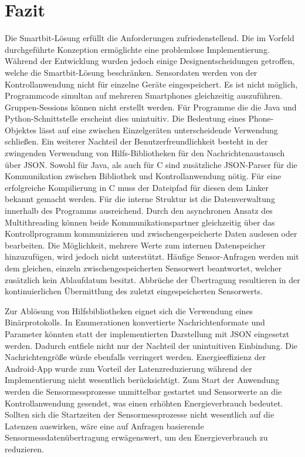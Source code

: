 \documentclass[11pt,a4paper]{report}
\begin{document}
\chapter{Fazit}\label{chap:fazit}
Die Smartbit-Lösung erfüllt die Anforderungen zufriedenstellend.
Die im Vorfeld durchgeführte Konzeption ermöglichte eine problemlose Implementierung.
Während der Entwicklung wurden jedoch einige Designentscheidungen getroffen, welche die Smartbit-Lösung beschränken.
Sensordaten werden von der Kontrollanwendung nicht für einzelne Geräte eingespeichert.
Es ist nicht möglich, Programmcode simultan auf mehreren Smartphones gleichzeitig auszuführen.
Gruppen-Sessions können nicht erstellt werden.
Für Programme die die Java und Python-Schnittstelle erscheint dies unintuitiv.
Die Bedeutung eines Phone-Objektes lässt auf eine zwischen Einzelgeräten unterscheidende Verwendung schließen.
Ein weiterer Nachteil der Benutzerfreundlichkeit besteht in der zwingenden Verwendung von Hilfs-Bibliotheken für den Nachrichtenaustausch über JSON.
Sowohl für Java, als auch für C sind zusätzliche JSON-Parser für die Kommunikation zwischen Bibliothek und Kontrollanwendung nötig.
Für eine erfolgreiche Kompilierung in C muss der Dateipfad für diesen dem Linker bekannt gemacht werden.
Für die interne Struktur ist die Datenverwaltung innerhalb des Programms ausreichend.
Durch den asynchronen Ansatz des Multithreading können beide Kommunikationspartner gleichzeitig über das Kontrollprogramm kommunizieren und zwischengespeicherte Daten auslesen oder bearbeiten.
Die Möglichkeit, mehrere Werte zum internen Datenspeicher hinzuzufügen, wird jedoch nicht unterstützt.
Häufige Sensor-Anfragen werden mit dem gleichen, einzeln zwischengespeicherten Sensorwert beantwortet, welcher zusätzlich kein Ablaufdatum besitzt.
Abbrüche der Übertragung resultieren in der kontinuierlichen Übermittlung des zuletzt eingespeicherten Sensorwerts.

Zur Ablösung von Hilfsbibliotheken eignet sich die Verwendung eines Binärprotokolls.
In Enumerationen konvertierte Nachrichtenformate und Parameter könnten statt der implementierten Darstellung mit JSON eingesetzt werden.
Dadurch entfiele nicht nur der Nachteil der unintuitiven Einbindung.
Die Nachrichtengröße würde ebenfalls verringert werden.
Energieeffizienz der Android-App wurde zum Vorteil der Latenzreduzierung während der Implementierung nicht wesentlich berücksichtigt.
Zum Start der Anwendung werden die Sensormessprozesse unmittelbar gestartet und Sensorwerte an die Kontrollanwendung gesendet, was einen erhöhten Energieverbrauch bedeutet.
Sollten sich die Startzeiten der Sensormessprozesse nicht wesentlich auf die Latenzen auswirken, wäre eine auf Anfragen basierende Sensormessdatenübertragung erwägenswert, um den Energieverbrauch zu reduzieren.
\end{document}
